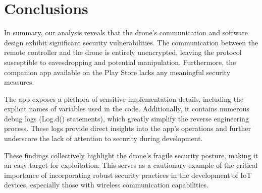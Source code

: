 \section{Conclusions}
In summary, our analysis reveals that the drone’s communication and software design exhibit significant security vulnerabilities. The communication between the remote controller and the drone is entirely unencrypted, leaving the protocol susceptible to eavesdropping and potential manipulation. Furthermore, the companion app available on the Play Store lacks any meaningful security measures.

The app exposes a plethora of sensitive implementation details, including the explicit names of variables used in the code. Additionally, it contains numerous debug logs (Log.d() statements), which greatly simplify the reverse engineering process. These logs provide direct insights into the app's operations and further underscore the lack of attention to security during development.


These findings collectively highlight the drone's fragile security posture, making it an easy target for exploitation. This serves as a cautionary example of the critical importance of incorporating robust security practices in the development of IoT devices, especially those with wireless communication capabilities.
